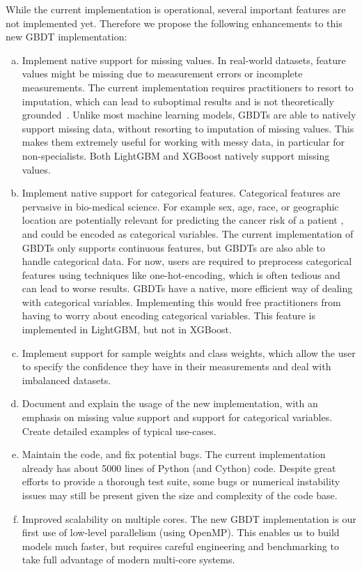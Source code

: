 \documentclass[11pt]{article}  %
\begin{document}
While the current implementation is operational,
several important features are not implemented yet. Therefore we propose the following enhancements to this new GBDT implementation:
\begin{enumerate}[a)]
\item Implement native support for missing values. In real-world datasets, feature values might be missing due to measurement errors or incomplete measurements. The current implementation requires practitioners to resort to
imputation, which can lead to suboptimal results and is not theoretically grounded~\cite{missing_values_consistency}.
Unlike most machine learning models, GBDTs are able to natively support
missing data, without resorting to imputation of missing values. This makes
them extremely useful for working with messy data, in particular for non-specialists. Both
LightGBM and XGBoost natively support missing values.
\item Implement native support for categorical features. Categorical
features are pervasive in bio-medical science. For example sex, age, race,
or geographic location are potentially relevant
for predicting the cancer risk of a patient \cite{RICHTER201929}, and could be encoded as categorical variables. The current
implementation of GBDTs only supports continuous features, but GBDTs are
also able to handle categorical data. For now, users are required to
preprocess categorical features using techniques like one-hot-encoding, which
is often tedious and can lead to worse results. GBDTs have a native, more efficient way of dealing with categorical variables. 
Implementing this would free practitioners from having to worry about encoding categorical variables.
This feature is implemented in LightGBM, but not in XGBoost.
\item Implement support for sample weights and class weights, which allow the user to specify the confidence they have in their measurements and deal with imbalanced datasets.
\item Document and explain the usage of the new implementation, with an emphasis on missing value support and support for categorical variables. Create detailed examples of typical use-cases.
\item Maintain the code, and fix potential bugs. The current
implementation already has about 5000 lines of Python (and Cython) code.
Despite great efforts to provide a thorough test suite, some bugs or
numerical instability issues may still be present given the size and complexity of the
code base.

\item Improved scalability on multiple cores. The new GBDT implementation is our first use of low-level
parallelism (using OpenMP). This enables us to build models much faster, but requires careful engineering and benchmarking to take full advantage of modern multi-core systems.
\end{enumerate}
\end{document}

